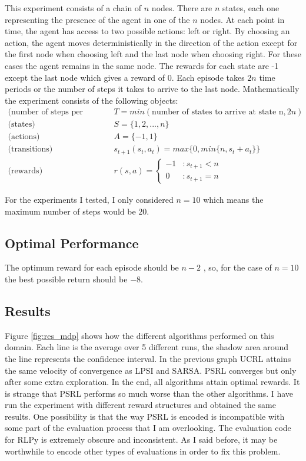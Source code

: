 \documentclass[12pt]{article}
\begin{document}
This experiment consists of a chain of $n$ nodes. There are $n$  states, each one representing the presence of the agent in one of the $n$ nodes. At each point in time, the agent has access to two possible actions: left or right. By choosing an action, the agent moves deterministically in the direction of the action except for the first node when choosing left and the last node when choosing right. For these cases the agent remains in the same node. The rewards for each state are -1 except the last node which gives a reward of 0. Each episode takes $2n$ time periods or the number of steps it takes to arrive to the last node. Mathematically the experiment consists of the following objects:
\begin{equation}
\begin{array}{rl}
\text{(number of steps per episode)} & T = \textit{min}(\text{number of states to arrive at state n},2n)\\
\text{(states)}&S = \{1,2,..., n\}\\
\text{(actions)} &A = \{-1,1\}\\
\text{(transitions)} & s_{t+1}(s_t,a_t) = max\{0,min\{n,s_t+a_t\}\}\\
\text{(rewards)}& r(s,a) = \left\lbrace \begin{array}{lr}
-1 & : s_{t+1}<n\\
0 & :s_{t+1}=n
\end{array} \right.
\end{array}
\end{equation}

For the experiments I tested, I only considered $n=10$ which means the maximum number of steps would be $20$. 

\subsection{Optimal Performance}

The optimum reward for each episode should be $n-2$ , so, for the case of $n=10$ the best possible return should be $-8$.

\subsection{Results}

 Figure \ref{fig:res_mdp} shows how the different algorithms performed on this domain. Each line is the average over 5 different runs, the shadow area around the line represents the confidence interval. In the previous graph UCRL attains the same velocity of convergence as LPSI and SARSA. PSRL converges but only after some extra exploration. In the end, all algorithms attain optimal rewards. It is strange that PSRL performs so much worse than the other algorithms. I have run the experiment with different reward structures and obtained the same results. One possibility is that the way PSRL is encoded is incompatible with some part of the evaluation process that I am overlooking. The evaluation code for RLPy is extremely obscure and inconsistent. As I said before, it may be worthwhile to encode other types of evaluations in order to fix this problem.
\end{document}
